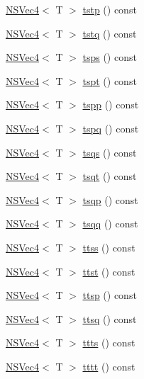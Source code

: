 \begin{DoxyCompactItemize}
\item 
\hyperlink{structNSVec4}{N\-S\-Vec4}$<$ T $>$ \hyperlink{structNSVec4_a37c8af541a90bd85709bcc8119314901}{tstp} () const 
\item 
\hyperlink{structNSVec4}{N\-S\-Vec4}$<$ T $>$ \hyperlink{structNSVec4_a301260828fdd92b7846eeeff41965c98}{tstq} () const 
\item 
\hyperlink{structNSVec4}{N\-S\-Vec4}$<$ T $>$ \hyperlink{structNSVec4_a54c6af6e34e342574a9d62d3f1f99cda}{tsps} () const 
\item 
\hyperlink{structNSVec4}{N\-S\-Vec4}$<$ T $>$ \hyperlink{structNSVec4_a2a64e3815c72cf7e797cd53ca81e22a6}{tspt} () const 
\item 
\hyperlink{structNSVec4}{N\-S\-Vec4}$<$ T $>$ \hyperlink{structNSVec4_a83d4795d872e834e9e51243750ef1180}{tspp} () const 
\item 
\hyperlink{structNSVec4}{N\-S\-Vec4}$<$ T $>$ \hyperlink{structNSVec4_ad3a9af2647fc6044c2b405172c118c5e}{tspq} () const 
\item 
\hyperlink{structNSVec4}{N\-S\-Vec4}$<$ T $>$ \hyperlink{structNSVec4_a0d03f8597b9c5928f3c1e71166e8c832}{tsqs} () const 
\item 
\hyperlink{structNSVec4}{N\-S\-Vec4}$<$ T $>$ \hyperlink{structNSVec4_a054ad371daf6c7bb24a2a6c763ec9ab4}{tsqt} () const 
\item 
\hyperlink{structNSVec4}{N\-S\-Vec4}$<$ T $>$ \hyperlink{structNSVec4_ae1752085fb4e3400aa01c286dcabb1d1}{tsqp} () const 
\item 
\hyperlink{structNSVec4}{N\-S\-Vec4}$<$ T $>$ \hyperlink{structNSVec4_a7db8ce5dff65b8d1104e0b790155ffdc}{tsqq} () const 
\item 
\hyperlink{structNSVec4}{N\-S\-Vec4}$<$ T $>$ \hyperlink{structNSVec4_a685e8fae09cf0c1e978cdef460689810}{ttss} () const 
\item 
\hyperlink{structNSVec4}{N\-S\-Vec4}$<$ T $>$ \hyperlink{structNSVec4_aea87adc6f6fe736aab104592cb8695c8}{ttst} () const 
\item 
\hyperlink{structNSVec4}{N\-S\-Vec4}$<$ T $>$ \hyperlink{structNSVec4_a51a434bd5596bcab9f86dcbcacfe92dd}{ttsp} () const 
\item 
\hyperlink{structNSVec4}{N\-S\-Vec4}$<$ T $>$ \hyperlink{structNSVec4_a1e23d015ee222dd5d23ba61e4edf9e94}{ttsq} () const 
\item 
\hyperlink{structNSVec4}{N\-S\-Vec4}$<$ T $>$ \hyperlink{structNSVec4_a6b18032cc50c6f021ff8d027a7b8cbac}{ttts} () const 
\item 
\hyperlink{structNSVec4}{N\-S\-Vec4}$<$ T $>$ \hyperlink{structNSVec4_a71d8e86577418ad9c5a1caa6c7ec50a7}{tttt} () const 

\end{DoxyCompactItemize}
